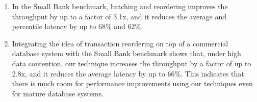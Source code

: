 \begin{enumerate}[leftmargin=*]
\item In the Small Bank benchmark, batching and reordering improves the throughput by up to a factor of 3.1x, and it reduces the average and percentile latency by up to 68\% and 62\%.
\item Integrating the idea of transaction reordering on top of a commercial database system with the Small Bank benchmark shows that, under high data contention, our technique increases the throughput by a factor of up to 2.8x, and it reduces the average latency by up to 66\%. This indicates that there is much room for performance improvements using our techniques even for mature database systems.
\end{enumerate}  
